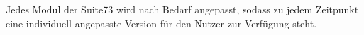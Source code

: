 Jedes Modul der Suite73 wird nach Bedarf angepasst, sodass zu jedem Zeitpunkt eine individuell angepasste Version für den Nutzer zur Verfügung steht.